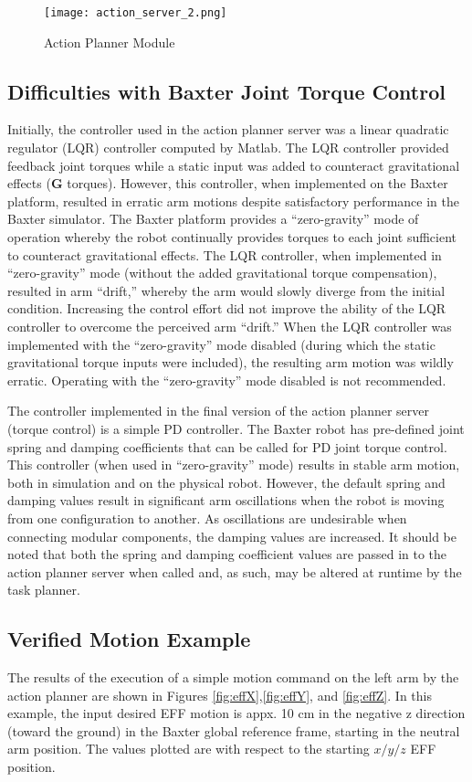 \begin{figure}[h]
	\texttt{[image: action\_server\_2.png]}
	\caption{Action Planner Module}
	\label{fig:actionPlannerFlow}
\end{figure}


\subsection{Difficulties with Baxter Joint Torque Control}
Initially, the controller used in the action planner server was a linear quadratic regulator (LQR) controller computed by Matlab.
The LQR controller provided feedback joint torques while a static input was added to counteract gravitational effects ($\mathbf{G}$ torques).
However, this controller, when implemented on the Baxter platform, resulted in erratic arm motions despite satisfactory performance in the Baxter simulator.
The Baxter platform provides a ``zero-gravity'' mode of operation whereby the robot continually provides torques to each joint sufficient to counteract gravitational effects.
The LQR controller, when implemented in ``zero-gravity'' mode (without the added gravitational torque compensation), resulted in arm ``drift,'' whereby the arm would slowly diverge from the initial condition.
Increasing the control effort did not improve the ability of the LQR controller to overcome the perceived arm ``drift.''
When the LQR controller was implemented with the ``zero-gravity'' mode disabled (during which the static gravitational torque inputs were included), the resulting arm motion was wildly erratic.
Operating with the ``zero-gravity'' mode disabled is not recommended.

The controller implemented in the final version of the action planner server (torque control) is a simple PD controller.
The Baxter robot has pre-defined joint spring and damping coefficients that can be called for PD joint torque control.
This controller (when used in ``zero-gravity'' mode) results in stable arm motion, both in simulation and on the physical robot.
However, the default spring and damping values result in significant arm oscillations when the robot is moving from one configuration to another.
As oscillations are undesirable when connecting modular components, the damping values are increased.
It should be noted that both the spring and damping coefficient values are passed in to the action planner server when called and, as such, may be altered at runtime by the task planner.

\subsection{Verified Motion Example}
The results of the execution of a simple motion command on the left arm by the action planner are shown in Figures \ref{fig:effX},\ref{fig:effY}, and \ref{fig:effZ}.
In this example, the input desired EFF motion is appx. 10 cm in the negative z direction (toward the ground) in the Baxter global reference frame, starting in the neutral arm position.
The values plotted are with respect to the starting $x/y/z$ EFF position.


